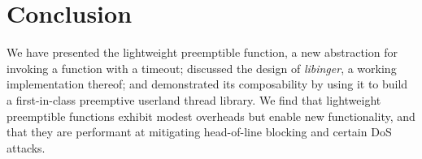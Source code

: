 \section{Conclusion}

We have presented the lightweight preemptible function, a new abstraction for
invoking a function with a timeout; discussed the design of \textit{libinger}, a
working implementation thereof; and demonstrated its composability by using it to
build a first-in-class preemptive userland thread library.  We find that lightweight
preemptible functions exhibit modest overheads but enable new functionality, and that
they are performant at mitigating head-of-line blocking and certain DoS attacks.
